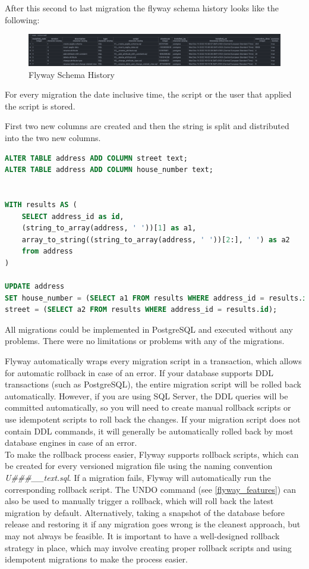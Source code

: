 After this second to last migration the flyway schema history looks like the following:
\begin{figure}[H]
	\centering
	\includegraphics[width=1.1\textwidth]{./chapters/scenarios/images/flyway_schema_history}
	\caption[Flyway Schema History - Source: Own illustration]{Flyway Schema History}
\end{figure}
For every migration the date inclusive time, the script or the user that applied the script is stored.

\newpage
{}%
First two new columns are created and then the string is split and distributed into the two new columns.

\begin{lstlisting}[language=SQL]
ALTER TABLE address ADD COLUMN street text;
ALTER TABLE address ADD COLUMN house_number text;


WITH results AS (
	SELECT address_id as id,
	(string_to_array(address, ' '))[1] as a1,
	array_to_string((string_to_array(address, ' '))[2:], ' ') as a2
	from address
)

UPDATE address
SET house_number = (SELECT a1 FROM results WHERE address_id = results.id),
street = (SELECT a2 FROM results WHERE address_id = results.id);
\end{lstlisting}

All migrations could be implemented in PostgreSQL and executed without any problems. There were no limitations or problems with any of the migrations.


%
Flyway automatically wraps every migration script in a transaction, which allows for automatic rollback in case of an error. If your database supports DDL transactions (such as PostgreSQL), the entire migration script will be rolled back automatically. However, if you are using SQL Server, the DDL queries will be committed automatically, so you will need to create manual rollback scripts or use idempotent scripts to roll back the changes. If your migration script does not contain DDL commands, it will generally be automatically rolled back by most database engines in case of an error.\\
To make the rollback process easier, Flyway supports rollback scripts, which can be created for every versioned migration file using the naming convention \textit{U\#\#\#\_\_text.sql}. If a migration fails, Flyway will automatically run the corresponding rollback script. The UNDO command (see \autoref{flyway_features}) can also be used to manually trigger a rollback, which will roll back the latest migration by default. Alternatively, taking a snapshot of the database before release and restoring it if any migration goes wrong is the cleanest approach, but may not always be feasible. It is important to have a well-designed rollback strategy in place, which may involve creating proper rollback scripts and using idempotent migrations to make the process easier.

